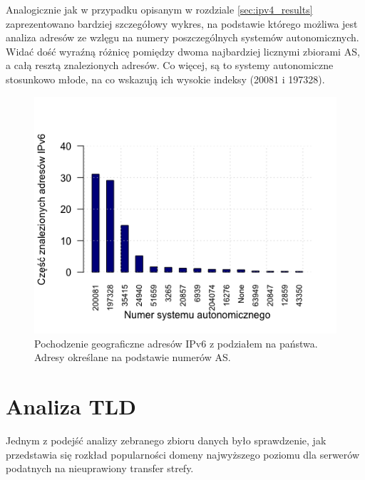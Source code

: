 Analogicznie jak w przypadku opisanym w rozdziale \ref{sec:ipv4_results} zaprezentowano bardziej szczegółowy wykres, na podstawie
którego możliwa jest analiza adresów ze wzlęgu na numery poszczególnych systemów autonomicznych. Widać dość wyraźną różnicę pomiędzy
dwoma najbardziej licznymi zbiorami AS, a całą resztą znalezionych adresów. Co więcej, są to systemy autonomiczne stosunkowo młode,
na co wskazują ich wysokie indeksy (20081 i 197328).
\begin{figure}[ht]
	\centering
	\includegraphics[width=1.0\textwidth]{image/Ipv6_as_count_no_title}
	\caption{Pochodzenie geograficzne adresów IPv6 z podziałem na państwa. Adresy określane na podstawie numerów AS.}
	\label{fig:ipv6_co}
\end{figure}

\section{Analiza TLD}
Jednym z podejść analizy zebranego zbioru danych było sprawdzenie, jak przedstawia się rozkład popularności domeny najwyższego poziomu
dla serwerów podatnych na nieuprawiony transfer strefy.

